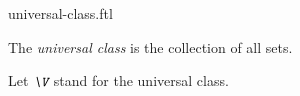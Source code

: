 \documentclass{naproche-library}
\begin{document}
\begin{smodule}[title=The Universal Class]{universal-class.ftl}

\begin{definition}[forthel,id=FOUNDATIONS_10_9625487120366325]
  The \emph{universal class} is the collection of all sets.

  Let $\emph{\V}$ stand for the universal class.
\end{definition}
\end{smodule}
\end{document}
